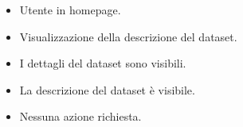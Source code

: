     \UCdsc
    { %
        \begin{itemize}
            \item Utente in homepage.
        \end{itemize}
    }
    { %
        \begin{itemize}
            \item   Visualizzazione della descrizione del dataset.
        \end{itemize}
    }
    { %
        \begin{itemize}
            \item I dettagli del dataset sono visibili.
        \end{itemize}
    }
    { %
        \begin{itemize}
            \item La descrizione del dataset è visibile.
        \end{itemize}
    }
    { %
        \begin{itemize}
            \item Nessuna azione richiesta.
        \end{itemize}
    }



